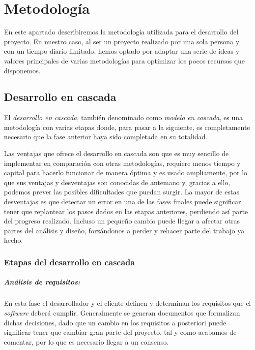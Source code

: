 \chapter{Metodología}

En este apartado describiremos la metodología utilizada para el desarrollo del proyecto. En nuestro caso, al ser un proyecto realizado por una sola persona y con un tiempo diario limitado, hemos optado por adaptar una serie de ideas y valores principales de varias metodologías para optimizar los pocos recursos que disponemos.

\section{Desarrollo en cascada}

El \textit{desarrollo en cascada}, también denominado como \textit{modelo en cascada}, es una metodología con varias etapas donde, para pasar a la siguiente, es completamente necesario que la fase anterior haya sido completada en su totalidad.

Las ventajas que ofrece el desarrollo en cascada son que es muy sencillo de implementar en comparación con otras metodologías, requiere menos tiempo y capital para hacerlo funcionar de manera óptima y es usado ampliamente, por lo que sus ventajas y desventajas son conocidas de antemano y, gracias a ello, podemos prever las posibles dificultades que puedan surgir. La mayor de estas desventajas es que detectar un error en una de las fases finales puede significar tener que replantear los pasos dados en las etapas anteriores, perdiendo así parte del progreso realizado. Incluso un pequeño cambio puede llegar a afectar otras partes del análisis y diseño, forzándonos a perder y rehacer parte del trabajo ya hecho. 

\subsection{Etapas del desarrollo en cascada}

\paragraph{Análisis de requisitos:}

En esta fase el desarrollador y el cliente definen y determinan los requisitos que el \textit{software} deberá cumplir. Generalmente se generan documentos que formalizan dichas decisiones, dado que un cambio en los requisitos a posteriori puede significar tener que cambiar gran parte del proyecto, tal y como acabamos de comentar, por lo que es necesario llegar a un consenso.

